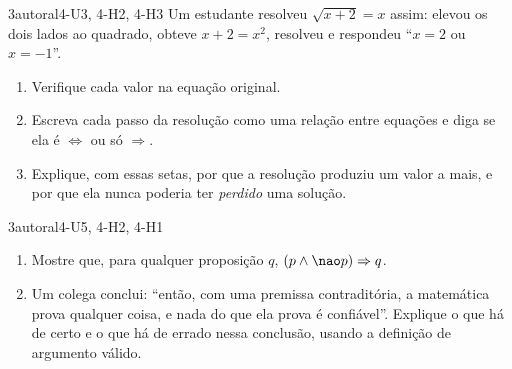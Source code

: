 \begin{questao}[integradora]{3}{autoral}{4-U3, 4-H2, 4-H3}\label{u4:q11}
Um estudante resolveu $\sqrt{x+2}=x$ assim: elevou os dois lados ao quadrado, obteve $x+2=x^2$, resolveu e respondeu \enquote{$x=2$ ou $x=-1$}.
\begin{enumerate}[label=\alph*)]
  \item Verifique cada valor na equação original.
  \item Escreva cada passo da resolução como uma relação entre equações e diga se ela é $\Leftrightarrow$ ou só $\Rightarrow$.
  \item Explique, com essas setas, por que a resolução produziu um valor a mais, e por que ela nunca poderia ter \emph{perdido} uma solução.
\end{enumerate}
\end{questao}

\begin{questao}{3}{autoral}{4-U5, 4-H2, 4-H1}\label{u4:q12}
\begin{enumerate}[label=\alph*)]
  \item Mostre que, para qualquer proposição $q$, $(p\wedge{\nao}p)\Rightarrow q$.
  \item Um colega conclui: \enquote{então, com uma premissa contraditória, a matemática prova qualquer coisa, e nada do que ela prova é confiável}. Explique o que há de certo e o que há de errado nessa conclusão, usando a definição de argumento válido.
\end{enumerate}
\end{questao}

